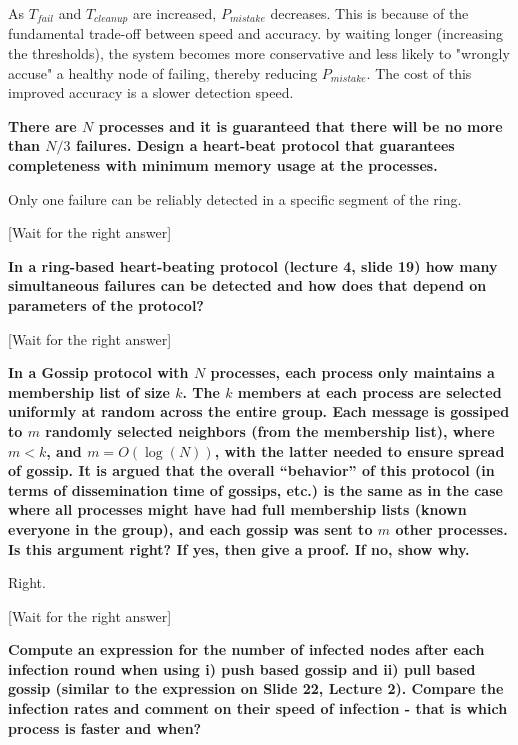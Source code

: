 \documentclass[12pt,a4paper]{article}
\begin{document}
As $T_{fail}$ and $T_{cleanup}$ are increased, $P_{mistake}$ decreases. 
This is because of the fundamental trade-off between speed and accuracy. by waiting longer (increasing the thresholds), the system becomes more conservative and less likely to "wrongly accuse" a healthy node of failing, thereby reducing $P_{mistake}$. 
The cost of this improved accuracy is a slower detection speed.

\textbf{There are $N$ processes and it is guaranteed that there will be no more than $N/3$ failures. Design a heart-beat protocol that guarantees completeness with minimum memory usage at the processes.}

Only one failure can be reliably detected in a specific segment of the ring.

[Wait for the right answer]

\textbf{In a ring-based heart-beating protocol (lecture 4, slide 19) how many simultaneous failures can be detected and how does that depend on parameters of the protocol?}

[Wait for the right answer]

\textbf{In a Gossip protocol with $N$ processes, each process only maintains a membership list of size $k$. The $k$ members at each process are selected uniformly at random across the entire group. Each message is gossiped to $m$ randomly selected neighbors (from the membership list), where $m < k$, and $m = O(\log(N))$, with the latter needed to ensure spread of gossip. It is argued that the overall ``behavior'' of this protocol (in terms of dissemination time of gossips, etc.) is the same as in the case where all processes might have had full membership lists (known everyone in the group), and each gossip was sent to $m$ other processes. Is this argument right? If yes, then give a proof. If no, show why.}

Right.

[Wait for the right answer]

\textbf{Compute an expression for the number of infected nodes after each infection round when using i) push based gossip and ii) pull based gossip (similar to the expression on Slide 22, Lecture 2). Compare the infection rates and comment on their speed of infection -  that is which process is faster and when?}
\end{document}
